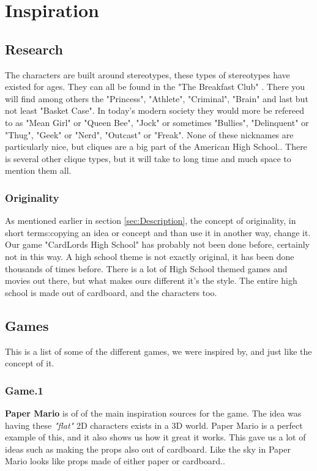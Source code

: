 \chapter{Inspiration}
\label{ch:kap2}

\section{Research}
\label{sec:Research}
The characters are built around stereotypes, these types of stereotypes have existed for ages. They can all be found in the "The Breakfast Club" \cite{BreakFastClub}.
There you will find among others the "Princess", "Athlete", "Criminal", "Brain" and last but not least "Basket Case". In today's modern society they would more be refereed to as "Mean Girl" or "Queen Bee", "Jock" or sometimes "Bullies", "Delinquent" or "Thug", "Geek" or "Nerd", "Outcast" or "Freak". None of these nicknames are particularly nice, but cliques are a big part of the American High School.\cite{Cliques}. There is several other clique types, but it will take to long time and much space to mention them all. 

\subsection{Originality}
\label{sec:originality}
As mentioned earlier in section \ref{sec:Description}, the concept of originality, in short terms:copying an idea or concept and than use it in another way, change it. Our game "CardLords High School" has probably not been done before, certainly not in this way. A high school theme is not exactly original, it has been done thousands of times before. There is a lot of High School themed games and movies out there, but what makes ours different it's the style. The entire high school is made out of cardboard, and the characters too.    


\section{Games}
\label{sec:Games}
This is a list of some of the different games, we were inspired by, and just like the concept of it. 

\subsection{Game.1}
\label{sec:paperMario}
\textbf{Paper Mario} is of of the main inspiration sources for the game. The idea was having these \textit{"flat"} 2D characters exists in a 3D world. Paper Mario is a perfect example of this, and it also shows us how it great it works. This gave us a lot of ideas such as making the props also out of cardboard. Like the sky in Paper Mario looks like props made of either paper or cardboard.\cite{PaperMario}.

